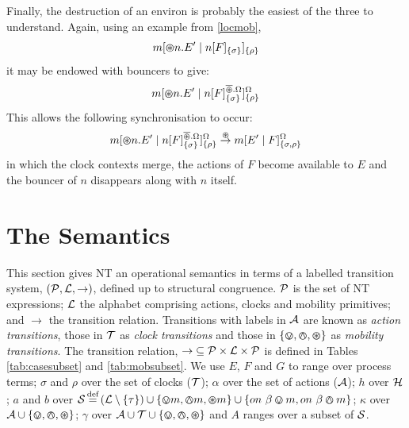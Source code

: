 Finally, the destruction of an environ is probably the easiest of the
three to understand.  Again, using an example from \ref{locmob},
\begin{equation}
{m}[ \varoast n.E^\prime\;|\;{n}[ F ]_{\{\sigma\}} ]_{\{\rho\}}
\end{equation}
it may be endowed with bouncers to give:
\begin{equation}
{m}[ \varoast n.E^\prime \;|\; {n}[ F ]^{\overline{\varoast}.\Omega}_{\{\sigma\}} ]^{\Omega}_{\{\rho\}}
\end{equation}
This allows the following synchronisation to occur:
\begin{equation}
{m}[ \varoast n.E^\prime \;|\; {n}[ F ]^{\overline{\varoast}.\Omega}_{\{\sigma\}} ]^{\Omega}_{\{\rho\}}
\stackrel{\varoast}{\rightarrow}
{m}[ E^\prime \;|\; {F} ]^{\Omega}_{\{\sigma, \rho\}}
\end{equation}
in which the clock contexts merge, the actions of $F$ become
available to $E$ and the bouncer of $n$ disappears along with $n$
itself.

\section{The Semantics}
\label{ntsemantics}

This section gives NT an operational semantics in terms of a labelled
transition system, $(\text{$\mathcal{P}$}, \text{$\mathcal{L}$}, \rightarrow)$, defined up to
structural congruence.  $\text{$\mathcal{P}$}$ is the set of NT expressions;
$\text{$\mathcal{L}$}$ the alphabet comprising actions, clocks and mobility
primitives; and $\rightarrow$ the transition relation.  Transitions
with labels in $\text{$\mathcal{A}$}$ are known as \emph{action transitions},
those in $\text{$\mathcal{T}$}$ as \emph{clock transitions} and those in $\text{$\{ \varovee, \varowedge , \varoast\}$}$
as \emph{mobility transitions}.  The transition relation,
$\mathop{\rightarrow} \mathrel{\subseteq} \text{$\mathcal{P}$} \times \text{$\mathcal{L}$} \times
\text{$\mathcal{P}$}$ is defined in Tables \ref{tab:casesubset} and
\ref{tab:mobsubset}.  We use $E$, $F$ and $G$ to range over process
terms; $\sigma$ and $\rho$ over the set of clocks ($\text{$\mathcal{T}$}$);
$\alpha$ over the set of actions ($\text{$\mathcal{A}$}$); $h$ over $\text{$\mathcal{H}$}$;
$a$ and $b$ over $\text{$\mathcal{S}$} \operatorname{\stackrel{\textrm{def}}{=}} \left(\text{$\mathcal{L}$} \setminus
\{\tau\}\right) \cup \{ \varovee m, \varowedge m, \varoast m \} \cup \{
on\ \beta \varovee m, on\ \beta \varowedge m \} $; $\kappa$ over $\text{$\mathcal{A}$}
\cup \text{$\{ \varovee, \varowedge , \varoast\}$}$; $\gamma$ over $\text{$\mathcal{A}$} \cup \text{$\mathcal{T}$} \cup \text{$\{ \varovee, \varowedge , \varoast\}$}$
and $A$ ranges over a subset of $\text{$\mathcal{S}$}$.

